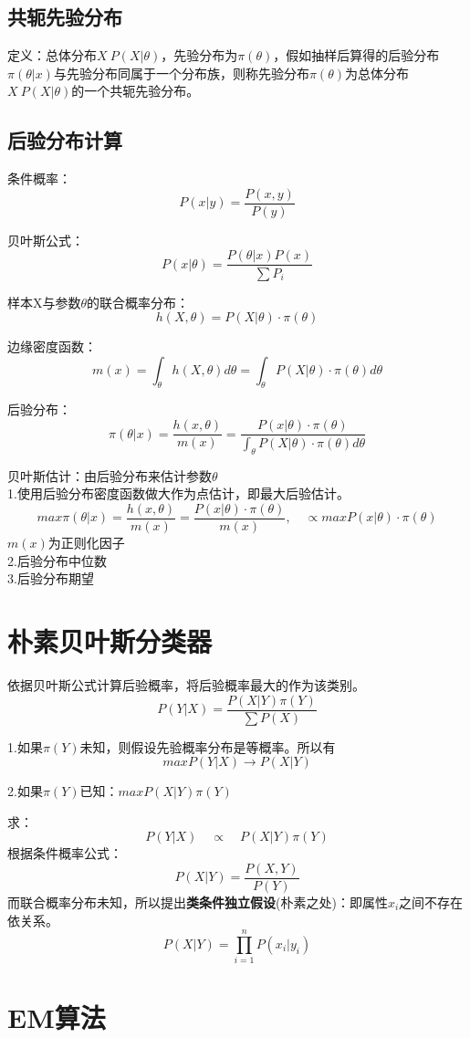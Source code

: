 \documentclass[UTF8]{ctexart} %
\begin{document}
		\subsection{共轭先验分布}
			定义：总体分布$X~P(X|\theta)$，先验分布为$\pi(\theta)$，假如抽样后算得的后验分布$\pi(\theta|x)$与先验分布同属于一个分布族，则称先验分布$\pi(\theta)$为总体分布$X~P(X|\theta)$的一个共轭先验分布。
		\subsection{后验分布计算}
			条件概率：
			\[P(x|y) = \frac{P(x,y)}{P(y)}\]	
			
			贝叶斯公式：
			\[P(x|\theta) = \frac{P(\theta|x)P(x)}{\sum P_i}\]
			
			样本X与参数$\theta$的联合概率分布：
			\[h(X,\theta) = P(X|\theta)\cdot\pi(\theta)\]
			
			边缘密度函数：
			\[m(x) = \int_\theta h(X,\theta)d\theta = \int_\theta P(X|\theta)\cdot\pi(\theta) d\theta\] 
			 
			后验分布：
			\[\pi(\theta|x) =  \frac{h(x,\theta)}{m(x)} = \frac{P(x|\theta)\cdot \pi(\theta)}{\int_\theta P(X|\theta)\cdot\pi(\theta) d\theta}\]
			
		
			贝叶斯估计：由后验分布来估计参数$\theta$\\
			1.使用后验分布密度函数做大作为点估计，即最大后验估计。
			\[max\pi(\theta|x) = \frac{h(x,\theta)}{m(x)} = \frac{P(x|\theta)\cdot \pi(\theta)}{m(x)},\quad \propto max P(x|\theta)\cdot \pi(\theta)\]
			$m(x)$为正则化因子\\
			2.后验分布中位数\\
			3.后验分布期望
	
	\section{朴素贝叶斯分类器}
		依据贝叶斯公式计算后验概率，将后验概率最大的作为该类别。
		\[P(Y|X) = \frac{P(X|Y)\pi(Y)}{\sum P(X)}\]
		
		1.如果$\pi(Y)$未知，则假设先验概率分布是等概率。所以有
		\[maxP(Y|X)\rightarrow P(X|Y)\]
		
		2.如果$\pi(Y)$已知：$maxP(X|Y)\pi(Y)$
		
		求：
		\[P(Y|X) \quad\propto\quad P(X|Y)\pi(Y)\]
		根据条件概率公式：
		\[P(X|Y) = \frac{P(X,Y)}{P(Y)}\]
		而联合概率分布未知，所以提出\textbf{类条件独立假设}(朴素之处)：即属性$x_i$之间不存在依关系。
		\[P(X|Y) = \prod_{i=1}^nP(x_i|y_i)\]
			
	\section{EM算法}
\end{document}
